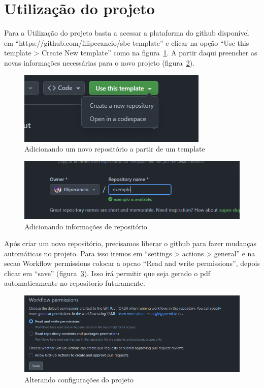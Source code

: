 \section{Utilização do projeto}

Para a Utilização do projeto basta a acessar a plataforma do github disponível em ``https://github.com/filipecancio/sbc-template'' e clicar na opção ``Use this template > Create New template'' como na figura~\ref{fig:image01}. A partir daqui preencher as novas informações necessárias para o novo projeto (figura~\ref{fig:image02}).

\begin{figure}[ht]
	\centering
	\includegraphics[width=.5\textwidth]{./images/image01.png}
	\caption{Adicionando um novo repositório a partir de um template}
	\label{fig:image01}
\end{figure}

\begin{figure}[ht]
	\centering
	\includegraphics[width=.5\textwidth]{./images/image02.png}
	\caption{Adicionando informações
		de repositório}
	\label{fig:image02}
\end{figure}
Após criar um novo repositório, precisamos liberar o github para fazer mudanças automáticas no projeto. Para isso iremos em  ``settings > actions > general'' e na secao Workflow permissions colocar a opcao ``Read and write permissions'', depois clicar em ``save'' (figura~\ref{fig:image03}). Isso irá permitir que seja gerado o pdf automaticamente no repositorio futuramente.

\begin{figure}[ht]
	\centering
	\includegraphics[width=.5\textwidth]{./images/image03.png}
	\caption{Alterando configurações do projeto}
	\label{fig:image03}
\end{figure}